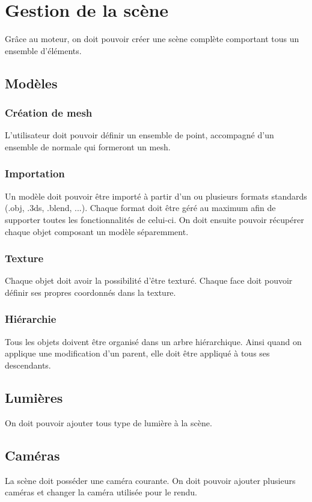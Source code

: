 \documentclass [a4 paper,11pt]{article}
\begin{document}
\section{Gestion de la scène}
Grâce au moteur, on doit pouvoir créer une scène complète comportant tous un ensemble d'éléments.
\subsection{Modèles}

\subsubsection*{Création de mesh}
L'utilisateur doit pouvoir définir un ensemble de point, accompagné d'un ensemble de normale qui formeront un mesh.
\subsubsection*{Importation}
Un modèle doit pouvoir être importé à partir d'un ou plusieurs formats standards (.obj, .3ds, .blend, ...).
Chaque format doit être géré au maximum afin de supporter toutes les fonctionnalités de celui-ci.
On doit ensuite pouvoir récupérer chaque objet composant un modèle séparemment.
\subsubsection*{Texture}
Chaque objet doit avoir la possibilité d'être texturé.
Chaque face doit pouvoir définir ses propres coordonnés dans la texture.
\subsubsection*{Hiérarchie}
Tous les objets doivent être organisé dans un arbre hiérarchique.
Ainsi quand on applique une modification d'un parent, elle doit être appliqué à tous ses descendants.

\subsection{Lumières}
On doit pouvoir ajouter tous type de lumière à la scène.

\subsection{Caméras}
La scène doit posséder une caméra courante.
On doit pouvoir ajouter plusieurs caméras et changer la caméra utilisée pour le rendu.
\end{document}
